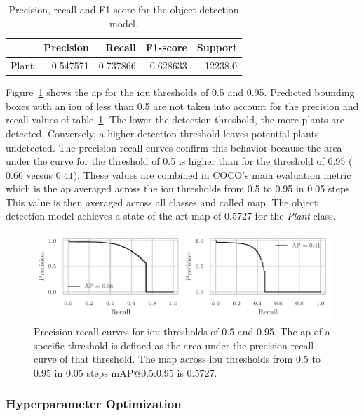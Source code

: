 \documentclass[draft,final]{vutinfth} %
\begin{document}
\begin{table}[h]
  \centering
  \begin{tabular}{lrrrr}
    \toprule
    {} &  Precision &    Recall &  F1-score &  Support \\
    \midrule
    Plant        &   0.547571 &  0.737866 &  0.628633 &  12238.0 \\
    \bottomrule
  \end{tabular}
  \caption{Precision, recall and F1-score for the object detection model.}
  \label{tab:yolo-metrics}
\end{table}

Figure~\ref{fig:yolo-ap} shows the \gls{ap} for the \gls{iou}
thresholds of 0.5 and 0.95. Predicted bounding boxes with an \gls{iou}
of less than 0.5 are not taken into account for the precision and
recall values of table~\ref{tab:yolo-metrics}. The lower the detection
threshold, the more plants are detected. Conversely, a higher
detection threshold leaves potential plants undetected. The
precision-recall curves confirm this behavior because the area under
the curve for the threshold of 0.5 is higher than for the threshold of
0.95 ($0.66$ versus $0.41$). These values are combined in COCO's
\cite{lin2015} main evaluation metric which is the \gls{ap} averaged
across the \gls{iou} thresholds from 0.5 to 0.95 in 0.05 steps. This
value is then averaged across all classes and called \gls{map}. The
object detection model achieves a state-of-the-art \gls{map} of 0.5727
for the \emph{Plant} class.

\begin{figure}
  \centering
  \includegraphics{graphics/APpt5-pt95.pdf}
  \caption[Object detection AP@0.5 and AP@0.95.]{Precision-recall
    curves for \gls{iou} thresholds of 0.5 and 0.95. The \gls{ap} of a
    specific threshold is defined as the area under the
    precision-recall curve of that threshold. The \gls{map} across
    \gls{iou} thresholds from 0.5 to 0.95 in 0.05 steps
    \textsf{mAP}@0.5:0.95 is 0.5727.}
  \label{fig:yolo-ap}
\end{figure}

\subsubsection{Hyperparameter Optimization}
\label{sssec:yolo-hyp-opt}
\end{document}
